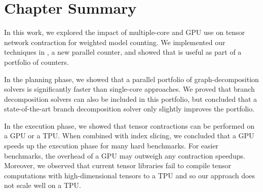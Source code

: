 \section{Chapter Summary}
In this work, we explored the impact of multiple-core and GPU use on tensor network contraction for weighted model counting. We implemented our techniques in , a new parallel counter, and showed that  is useful as part of a portfolio of counters.

In the planning phase, we showed that a parallel portfolio of graph-decomposition solvers is significantly faster than single-core approaches. We proved that branch decomposition solvers can also be included in this portfolio, but concluded that a state-of-the-art branch decomposition solver only slightly improves the portfolio. 

In the execution phase, we showed that tensor contractions can be performed on a GPU or a TPU. When combined with index slicing, we concluded that a GPU speeds up the execution phase for many hard benchmarks. For easier benchmarks, the overhead of a GPU may outweigh any contraction speedups. 
Moreover, we observed that current tensor libraries fail to compile tensor computations with high-dimensional tensors to a TPU and so our approach does not scale well on a TPU.
